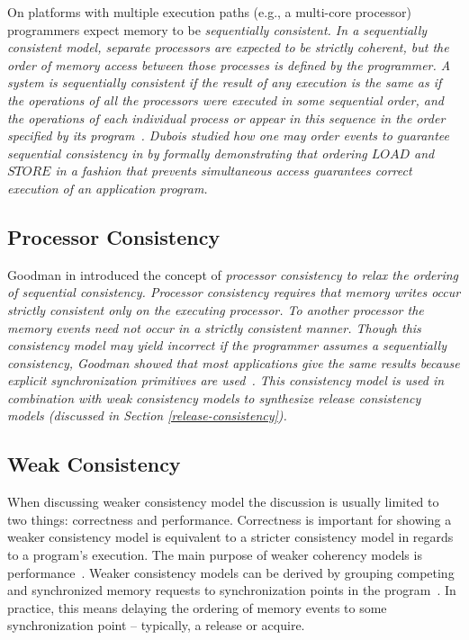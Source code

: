 On platforms with multiple execution paths (e.g., a multi-core processor) programmers expect memory to be \em sequentially consistent\em.  In a \em sequentially consistent \em model, separate processors are expected to be \em strictly coherent\em, but the order of memory access between those processes is defined by the programmer.  A system is sequentially consistent if the result of any execution is the same as if the operations of all the processors were executed in some sequential order, and the operations of each individual process or appear in this sequence in the order specified by its program~\cite{Lamport:1979:MMC:1311099.1311750}.  Dubois studied how one may order events to guarantee sequential consistency in \cite{Scheurich:1987:CMO:30350.30377} by formally demonstrating that ordering $LOAD$ and $STORE$ in a fashion that prevents simultaneous access guarantees correct execution of an application program. 

\subsection{Processor Consistency}

Goodman in \cite{Goodman:1989:53705} introduced the concept of \em processor consistency \em to relax the ordering of \em sequential consistency\em.  Processor consistency requires that memory writes occur strictly consistent only on the executing processor.  To another processor the memory events need not occur in a strictly consistent manner.  Though this consistency model may yield incorrect if the programmer assumes a sequentially consistency, Goodman showed that most applications give the same results because explicit synchronization primitives are used~\cite{Goodman:1989:53705}.  This consistency model is used in combination with weak consistency models to synthesize release consistency models (discussed in Section \ref{release-consistency}).

\subsection{Weak Consistency}
\label{weak-consistency}

When discussing weaker consistency model the discussion is usually limited to two things: correctness and performance.  Correctness is important for showing a weaker consistency model is equivalent to a stricter consistency model in regards to a program's execution.  The main purpose of weaker coherency models is performance~\cite{Gharachorloo:1990:MCE:325164.325102}.  Weaker consistency models can be derived by grouping competing and synchronized memory requests to synchronization points in the program~\cite{Gharachorloo:1990:MCE:325164.325102}.  In practice, this means delaying the ordering of memory events to some synchronization point -- typically, a release or acquire.

